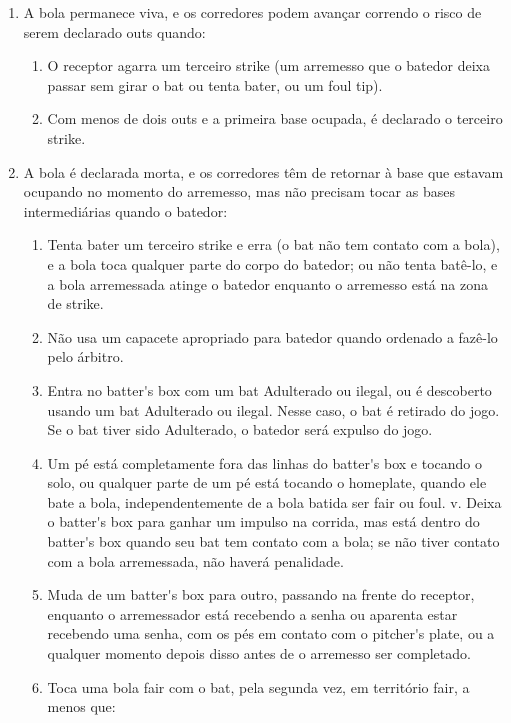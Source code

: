 \begin{multicols}{2}
	\begin{enumerate}[label=\alph*)]
		\item A bola permanece viva, e os corredores podem avan\c{c}ar correndo o risco de serem declarado \gls{out}s quando: 
		\begin{enumerate}[label=\roman*.]
			\item  O receptor agarra um terceiro \gls{strike} (um arremesso que o batedor deixa passar sem girar o \gls{bat} ou tenta bater, ou um \gls{foul tip}). 
			\item Com menos de dois \glspl{out} e a primeira base ocupada, \'e declarado o terceiro \gls{strike}. 
		\end{enumerate}	
		\item  A bola \'e declarada morta, e os corredores t\^em de retornar \`a base que estavam ocupando no momento do arremesso, mas n\~ao precisam tocar as bases intermedi\'arias quando o batedor: 
		
		\begin{enumerate}[label=\roman*.]
			\item  Tenta bater um terceiro \gls{strike} e erra (o \gls{bat} n\~ao tem contato com a bola), e a bola toca qualquer parte do corpo do batedor; ou n\~ao tenta bat\^e-lo, e a bola arremessada atinge o batedor enquanto o arremesso est\'a na zona de \gls{strike}. 
			\item N\~ao usa um capacete apropriado para batedor quando ordenado a faz\^e-lo pelo \'arbitro. 
			\item Entra no \gls{batter's box} com um \gls{bat} Adulterado ou ilegal, ou \'e descoberto usando um \gls{bat} Adulterado ou ilegal. Nesse caso, o \gls{bat} \'e retirado do jogo. Se o \gls{bat} tiver sido Adulterado, o batedor ser\'a expulso do jogo. 
			
			\item Um p\'e est\'a completamente fora das linhas do \gls{batter's box} e tocando o solo, ou qualquer parte de um p\'e est\'a tocando o \gls{homeplate}, quando ele bate a bola, independentemente de a bola batida ser \gls{fair} ou \gls{foul}. v. Deixa o \gls{batter's box} para ganhar um impulso na corrida, mas est\'a dentro do \gls{batter's box} quando seu \gls{bat} tem contato com a bola; se n\~ao tiver contato com a bola arremessada, n\~ao haver\'a penalidade. 
			\item Muda de um \gls{batter's box} para outro, passando na frente do receptor, enquanto o arremessador est\'a recebendo a senha ou aparenta estar recebendo uma senha, com os p\'es em contato com o \gls{pitcher's plate}, ou a qualquer momento depois disso antes de o arremesso ser completado. 
			\item Toca uma bola \gls{fair} com o \gls{bat}, pela segunda vez, em territ\'orio \gls{fair}, a menos que: 
			

\end{enumerate}
\end{enumerate}
\end{multicols}
